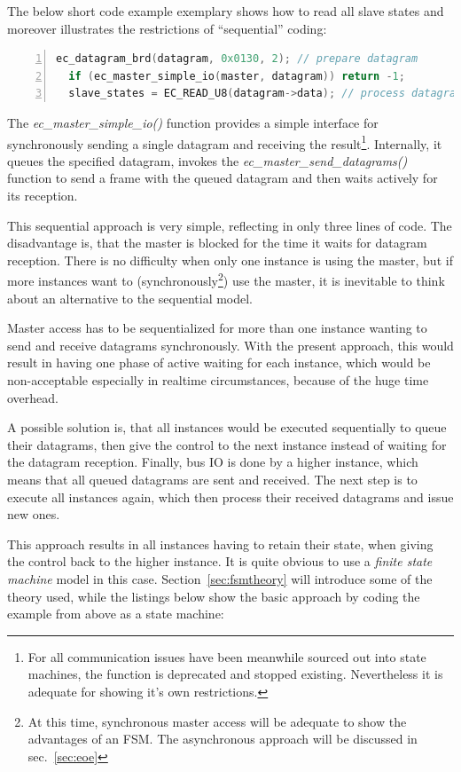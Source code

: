 \documentclass[a4paper,12pt,BCOR6mm,bibtotoc,idxtotoc]{scrbook}
\begin{document}
The below short code example exemplary shows how to read all slave
states and moreover illustrates the restrictions of ``sequential''
coding:

\begin{lstlisting}[gobble=2,language=C,numbers=left]
  ec_datagram_brd(datagram, 0x0130, 2); // prepare datagram
  if (ec_master_simple_io(master, datagram)) return -1;
  slave_states = EC_READ_U8(datagram->data); // process datagram
\end{lstlisting}

The \textit{ec\_master\_simple\_io()} function provides a simple interface for
synchronously sending a single datagram and receiving the result\footnote{For
all communication issues have been meanwhile sourced out into state machines,
the function is deprecated and stopped existing. Nevertheless it is adequate
for showing it's own restrictions.}. Internally, it queues the specified
datagram, invokes the \textit{ec\_master\_send\_datagrams()} function to send
a frame with the queued datagram and then waits actively for its reception.

This sequential approach is very simple, reflecting in only three lines of
code. The disadvantage is, that the master is blocked for the time it waits
for datagram reception. There is no difficulty when only one instance is using
the master, but if more instances want to (synchronously\footnote{At this
time, synchronous master access will be adequate to show the advantages of an
FSM. The asynchronous approach will be discussed in sec.~\ref{sec:eoe}}) use
the master, it is inevitable to think about an alternative to the sequential
model.

Master access has to be sequentialized for more than one instance
wanting to send and receive datagrams synchronously. With the present
approach, this would result in having one phase of active waiting for
each instance, which would be non-acceptable especially in realtime
circumstances, because of the huge time overhead.

A possible solution is, that all instances would be executed
sequentially to queue their datagrams, then give the control to the
next instance instead of waiting for the datagram reception. Finally,
bus IO is done by a higher instance, which means that all queued
datagrams are sent and received. The next step is to execute all
instances again, which then process their received datagrams and issue
new ones.

This approach results in all instances having to retain their state,
when giving the control back to the higher instance. It is quite
obvious to use a \textit{finite state machine} model in this case.
Section~\ref{sec:fsmtheory} will introduce some of the theory used,
while the listings below show the basic approach by coding the example
from above as a state machine:
\end{document}
